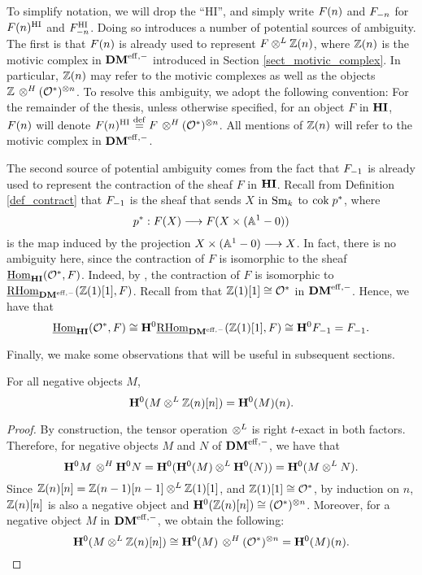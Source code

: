 \begin{rmk}\label{rmk_contraction}
To simplify notation, we will drop the ``HI'', and simply write 
$\LHI[n]{F}$ and $\RHI[n]{F}$ for $\LHIs[n]{F}$ and $\RHIs[n]{F}$.
Doing so introduces a number of potential sources of ambiguity. 
The first is that $\LHI[n]{F}$ is already used to represent $F 
\tDM \Z(n)$, where $\Z(n)$ is the motivic complex in $\DMeff$ 
introduced in Section \ref{sect_motivic_complex}. In particular, 
$\LHI[n]{\Z}$ may refer to the motivic complexes as well as the 
objects $\Z \tHI (\Ox)^{\tensor n}$. To resolve this ambiguity, we 
adopt the following convention: For the remainder of the thesis, 
unless otherwise specified, for an object $F$ in $\HI$, 
$\LHI[n]{F}$ will denote $\LHIs[n]{F} \defeq F \tHI 
(\Ox)^{\tensor n}$. All mentions of $\Z(n)$ will refer to the 
motivic complex in $\DMeff$.

The second source of potential ambiguity comes from the fact that 
$\RHI{F}$ is already used to represent the contraction of the 
sheaf $F$ in $\HI$. Recall from Definition \ref{def_contract} that 
$\RHI{F}$ is the sheaf that sends $X$ in $\Sm$ to $\cok p^*$, 
where 
\[
p^* : F(X) \to F(X \times (\A^1 - 0))
\]
is the map induced by the projection $X \times (\A^1 - 0) \to X$.
In fact, there is no ambiguity here, since the contraction of $F$ 
is isomorphic to the sheaf $\ihomHI(\Ox, F)$. Indeed, by 
\cite[3.4.5]{DegGenMot}, the contraction of $F$ is isomorphic to
$\ihomDMf(\Z(1)[1], F)$. Recall from \cite[4.1]{MVW} that 
$\Z(1)[1] \cong \Ox$ in $\DMeff$. Hence, we have that
\[
\ihomHI(\Ox, F) \cong \HH^0 \ihomDMf(\Z(1)[1], F) \cong \HH^0 
   \RHI{F} = \RHI{F}.
\]
\end{rmk}

Finally, we make some observations that will be useful in 
subsequent sections.

\begin{prop}\label{prop_LR_commute_with_HH}
For all negative objects $M$,
\[
\HH^0(M \tDM \Z(n)[n]) = \LHI[n]{\HH^0(M)}.
\]
\end{prop}
\begin{proof}
By construction, the tensor operation $\tDM$ is right 
$t$-exact in both factors. Therefore, for negative objects $M$ and 
$N$ of $\DMeff$, we have that
\[
\HH^0M\tHI \HH^0N = \HH^0(\HH^0(M) \tDM \HH^0(N)) = 
   \HH^0(M \tDM N).
\]
Since $\Z(n)[n] = \Z(n - 1)[n - 1] \tDM \Z(1)[1]$, and $\Z(1)[1] 
\cong \Ox$, by induction on $n$, $\Z(n)[n]$ is also a negative 
object and $\HH^0(\Z(n)[n]) \cong (\Ox)^{\tensor n}$. Moreover, for 
a negative object $M$ in $\DMeff$, we obtain the following:
\[
\HH^0(M \tDM \Z(n)[n]) \cong \HH^0(M) \tHI (\Ox)^{\tensor n} = 
   \LHI[n]{\HH^0(M)}. \qedhere
\]
\end{proof}

